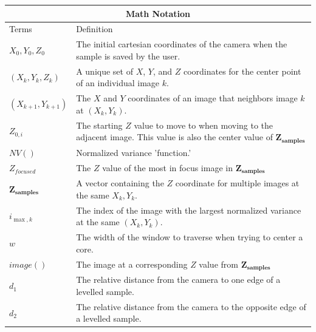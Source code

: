 \documentclass[a4paper,12pt]{article}
\begin{document}
\begin{tabular}{ |p{3cm}||p{12cm}|  }
  \hline
  \multicolumn{2}{|c|}{Math Notation} \\
  \hline
  Terms & Definition\\
  \hline
  $X_0, Y_0, Z_0$   &The initial cartesian coordinates of the camera when the sample is saved by the user. \\
  $(X_k, Y_k, Z_k)$ & A unique set of $X$, $Y$, and $Z$ coordinates for the center point of an individual image $k$. \\
  $(X_{k+1}, Y_{k+1})$ & The $X$ and $Y$ coordinates of an image that neighbors image $k$ at $(X_k, Y_k)$. \\
  $Z_{0,i}$ & The starting $Z$ value to move to when moving to the adjacent image. This value is also the center value of $\boldsymbol{Z_{\text{samples}}}$ \\
  $NV()$ & Normalized variance 'function.' \\
  $Z_{focused}$ & The $Z$ value of the most in focus image in $\boldsymbol{Z_{\text{samples}}}$\\
  $\boldsymbol{Z_{\text{samples}}}$ & A vector containing the $Z$ coordinate for multiple images at the same $X_k, Y_k$. \\
  $i_{\max,k}$ & The index of the image with the largest normalized variance at the same $(X_k, Y_k)$. \\
  $w$ & The width of the window to traverse when trying to center a core. \\
  $image()$ & The image at a corresponding $Z$ value from $\boldsymbol{Z_{\text{samples}}}$ \\
  $d_1$ & The relative distance from the camera to one edge of a levelled sample. \\
  $d_2$ & The relative distance from the camera to the opposite edge of a levelled sample. \\

  \hline
 \end{tabular}


\end{document}

